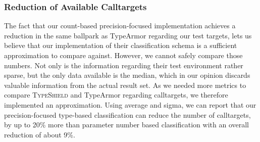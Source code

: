 \subsubsection{Reduction of Available Calltargets}
The fact that our count-based precision-focused implementation achieves a reduction in the same ballpark as TypeArmor regarding our test targets, 
lets us believe that our implementation of their classification schema is a sufficient approximation to compare against. However, we cannot safely
compare those numbers. Not only is the information regarding their test environment rather sparse, but the only data available is the median, 
which in our opinion discards valuable information from the actual result set. As we needed more metrics to compare \textsc{TypeShield} and
TypeArmor regarding calltargets, we therefore implemented an approximation. Using average and sigma, we can report that our precision-focused
type-based classification can reduce the number of calltargets, by up to 20\% more than parameter number based classification with an overall
reduction of about 9\%.


